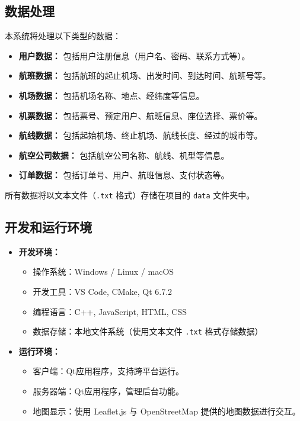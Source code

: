 \documentclass[UTF8, a4paper,12pt]{ctexart}
\begin{document}
\subsection{数据处理}
本系统将处理以下类型的数据：
\begin{itemize}
    \item \textbf{用户数据：} 包括用户注册信息（用户名、密码、联系方式等）。
    \item \textbf{航班数据：} 包括航班的起止机场、出发时间、到达时间、航班号等。
    \item \textbf{机场数据：} 包括机场名称、地点、经纬度等信息。
    \item \textbf{机票数据：} 包括票号、预定用户、航班信息、座位选择、票价等。
    \item \textbf{航线数据：} 包括起始机场、终止机场、航线长度、经过的城市等。
    \item \textbf{航空公司数据：} 包括航空公司名称、航线、机型等信息。
    \item \textbf{订单数据：} 包括订单号、用户、航班信息、支付状态等。
\end{itemize}

所有数据将以文本文件（\texttt{.txt} 格式）存储在项目的 \texttt{data} 文件夹中。

\subsection{开发和运行环境}
\begin{itemize}
    \item \textbf{开发环境：}
    \begin{itemize}
        \item 操作系统：Windows / Linux / macOS
        \item 开发工具：VS Code, CMake, Qt 6.7.2
        \item 编程语言：C++, JavaScript, HTML, CSS
        \item 数据存储：本地文件系统（使用文本文件 \texttt{.txt} 格式存储数据）
    \end{itemize}
    
    \item \textbf{运行环境：}
    \begin{itemize}
        \item 客户端：Qt应用程序，支持跨平台运行。
        \item 服务器端：Qt应用程序，管理后台功能。
        \item 地图显示：使用 Leaflet.js 与 OpenStreetMap 提供的地图数据进行交互。
    \end{itemize}
\end{itemize}
\end{document}
